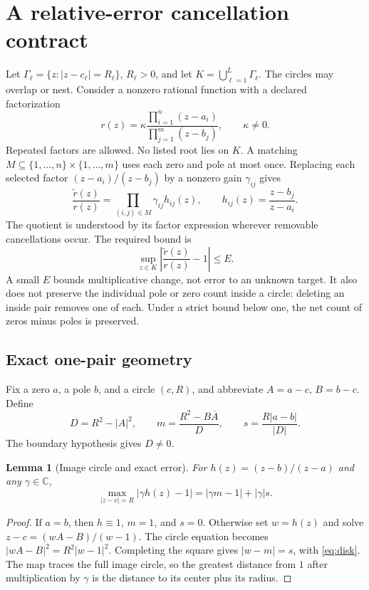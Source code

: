 \documentclass[11pt]{article}
\newtheorem{lemma}[theorem]{Lemma}
\theoremstyle{definition}\newtheorem{definition}[theorem]{Definition}
\newcommand{\C}{\mathbb C}\newcommand{\R}{\mathbb R}\newcommand{\eps}{\varepsilon}
\begin{document}
\section{A relative-error cancellation contract}
Let $\Gamma_\ell=\{z:|z-c_\ell|=R_\ell\}$, $R_\ell>0$, and let $K=\bigcup_{\ell=1}^L\Gamma_\ell$. The circles may overlap or nest. Consider a nonzero rational function with a declared factorization
\begin{equation}
 r(z)=\kappa\frac{\prod_{i=1}^{n}(z-a_i)}{\prod_{j=1}^{m}(z-b_j)},\qquad \kappa\ne0.\label{eq:factor}
\end{equation}
Repeated factors are allowed. No listed root lies on $K$. A matching $M\subseteq\{1,\ldots,n\}\times\{1,\ldots,m\}$ uses each zero and pole at most once. Replacing each selected factor $(z-a_i)/(z-b_j)$ by a nonzero gain $\gamma_{ij}$ gives
\begin{equation}
 \frac{\widetilde r(z)}{r(z)}=\prod_{(i,j)\in M}\gamma_{ij}h_{ij}(z),\qquad
 h_{ij}(z)=\frac{z-b_j}{z-a_i}.\label{eq:ratio}
\end{equation}
The quotient is understood by its factor expression wherever removable cancellations occur. The required bound is
\begin{equation}
 \sup_{z\in K}\left|\frac{\widetilde r(z)}{r(z)}-1\right|\le E.\label{eq:contract}
\end{equation}
A small $E$ bounds multiplicative change, not error to an unknown target. It also does not preserve the individual pole or zero count inside a circle: deleting an inside pair removes one of each. Under a strict bound below one, the net count of zeros minus poles is preserved.

\subsection{Exact one-pair geometry}
Fix a zero $a$, a pole $b$, and a circle $(c,R)$, and abbreviate $A=a-c$, $B=b-c$. Define
\begin{equation}
 D=R^2-|A|^2,\qquad
 m=\frac{R^2-B\overline A}{D},\qquad
 s=\frac{R|a-b|}{|D|}.\label{eq:disk}
\end{equation}
The boundary hypothesis gives $D\ne0$.

\begin{lemma}[Image circle and exact error]\label{lem:image}
For $h(z)=(z-b)/(z-a)$ and any $\gamma\in\C$,
\begin{equation}
 \max_{|z-c|=R}|\gamma h(z)-1|=|\gamma m-1|+|\gamma|s.\label{eq:error}
\end{equation}
\end{lemma}
\begin{proof}
If $a=b$, then $h\equiv1$, $m=1$, and $s=0$. Otherwise set $w=h(z)$ and solve $z-c=(wA-B)/(w-1)$. The circle equation becomes $|wA-B|^2=R^2|w-1|^2$. Completing the square gives $|w-m|=s$, with \eqref{eq:disk}. The map traces the full image circle, so the greatest distance from $1$ after multiplication by $\gamma$ is the distance to its center plus its radius.
\end{proof}
\end{document}
